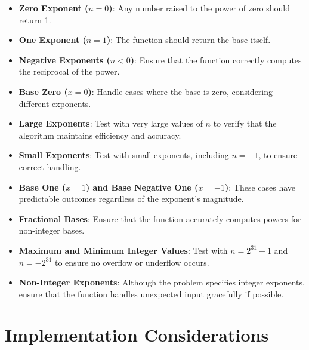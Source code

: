 \begin{itemize}
    \item \textbf{Zero Exponent (\(n = 0\))}: Any number raised to the power of zero should return 1.
    
    \item \textbf{One Exponent (\(n = 1\))}: The function should return the base itself.
    
    \item \textbf{Negative Exponents (\(n < 0\))}: Ensure that the function correctly computes the reciprocal of the power.
    
    \item \textbf{Base Zero (\(x = 0\))}: Handle cases where the base is zero, considering different exponents.
    
    \item \textbf{Large Exponents}: Test with very large values of \(n\) to verify that the algorithm maintains efficiency and accuracy.
    
    \item \textbf{Small Exponents}: Test with small exponents, including \(n = -1\), to ensure correct handling.
    
    \item \textbf{Base One (\(x = 1\)) and Base Negative One (\(x = -1\))}: These cases have predictable outcomes regardless of the exponent's magnitude.
    
    \item \textbf{Fractional Bases}: Ensure that the function accurately computes powers for non-integer bases.
    
    \item \textbf{Maximum and Minimum Integer Values}: Test with \(n = 2^{31} - 1\) and \(n = -2^{31}\) to ensure no overflow or underflow occurs.
    
    \item \textbf{Non-Integer Exponents}: Although the problem specifies integer exponents, ensure that the function handles unexpected input gracefully if possible.
\end{itemize}

\section*{Implementation Considerations}


